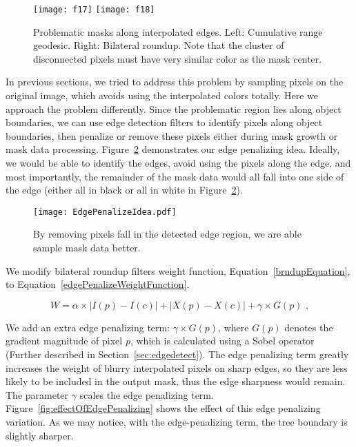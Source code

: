 \begin{figure}[htbp]\centering
\texttt{[image: f17]}
\texttt{[image: f18]}
\caption{Problematic masks along interpolated edges. Left: Cumulative range geodesic. Right: Bilateral roundup. Note that the cluster of disconnected pixels must have very similar color as the mask center.}
\label{fig:problematicMasks}
\end{figure}

In previous sections, we tried to address this problem by sampling pixels on the original image, which avoids using the interpolated colors totally. Here we approach the problem differently. Since the problematic region lies along object boundaries, we can use edge detection filters to identify pixels along object boundaries, then penalize or remove these pixels either during mask growth or mask data processing. Figure~\ref{fig:edgePenalize} demonstrates our edge penalizing idea. Ideally, we would be able to identify the edges, avoid using the pixels along the edge, and most importantly, the remainder of the mask data would all fall into one side of the edge (either all in black or all in white in Figure~\ref{fig:edgePenalize}).

\begin{figure}[htbp]\centering
\texttt{[image: EdgePenalizeIdea.pdf]}
\caption{By removing pixels fall in the detected edge region, we are able sample mask data better.}
\label{fig:edgePenalize}
\end{figure}

We modify bilateral roundup filter\textquotesingle s weight function, Equation~\eqref{brndupEquation}, to Equation~\eqref{edgePenalizeWeightFunction}.

\begin{equation}\label {edgePenalizeWeightFunction}
W = \alpha \times |I(p)-I(c)|  + |X(p)-X(c)| + \gamma \times G(p) \text{ ,}
\end{equation}

We add an extra edge penalizing term: $\gamma \times G(p)$, where $G(p)$ denotes the gradient magnitude of pixel $p$, which is calculated using a Sobel operator~\cite[p.~271-273]{Sobel} (Further described in Section~\ref{sec:edgedetect}). The edge penalizing term greatly increases the weight of blurry interpolated pixels on sharp edges, so they are less likely to be included in the output mask, thus the edge sharpness would remain. The parameter $\gamma$ scales the edge penalizing term. Figure~\ref{fig:effectOfEdgePenalizing} shows the effect of this edge penalizing variation. As we may notice, with the edge-penalizing term, the tree boundary is slightly sharper. 

